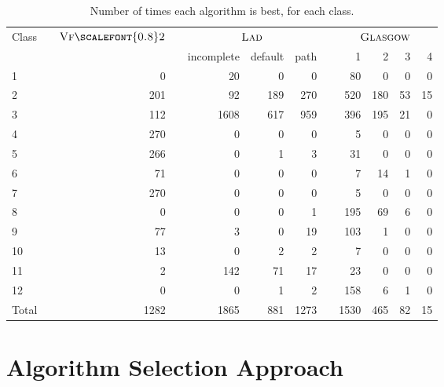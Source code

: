 \documentclass{llncs}
\newcommand{\VFtwo}{$\textsc{Vf{\scalefont{0.8}2}}$\xspace}
\newcommand{\Glasgow}{$\textsc{Glasgow}$\xspace}
\newcommand{\LAD}{$\textsc{Lad}$\xspace}
\begin{document}
\begin{table}[t]
\begin{center}
\begin{tabularx}{.8\textwidth}{XXrXrrrXrrrr}
\toprule
Class && \VFtwo && \multicolumn{3}{c}{\LAD} && \multicolumn{4}{c}{\hspace*{2em}\Glasgow}\\
&&&&incomplete&default&path&&1&2&3&4\\
\midrule
1 &&        0 &&       20 &        0 &        0 &&       80 &        0 &        0 &        0 \\
2 &&      201 &&       92 &      189 &      270 &&      520 &      180 &       53 &       15 \\
3 &&      112 &&     1608 &      617 &      959 &&      396 &      195 &       21 &        0 \\
4 &&      270 &&        0 &        0 &        0 &&        5 &        0 &        0 &        0 \\
5 &&      266 &&        0 &        1 &        3 &&       31 &        0 &        0 &        0 \\
6 &&       71 &&        0 &        0 &        0 &&        7 &       14 &        1 &        0 \\
7 &&      270 &&        0 &        0 &        0 &&        5 &        0 &        0 &        0 \\
8 &&        0 &&        0 &        0 &        1 &&      195 &       69 &        6 &        0 \\
9 &&       77 &&        3 &        0 &       19 &&      103 &        1 &        0 &        0 \\
10 &&       13 &&        0 &        2 &        2 &&        7 &        0 &        0 &        0 \\
11 &&        2 &&      142 &       71 &       17 &&       23 &        0 &        0 &        0 \\
12 &&        0 &&        0 &        1 &        2 &&      158 &        6 &        1 &        0 \\
\midrule
Total && 1282 && 1865 & 881 & 1273 && 1530 & 465 & 82& 15\\
\bottomrule
\end{tabularx}
\end{center}
\caption{Number of times each algorithm is best, for each class.\label{expClass}}
\end{table}

\section{Algorithm Selection Approach}\label{sec:algsel}
\end{document}
